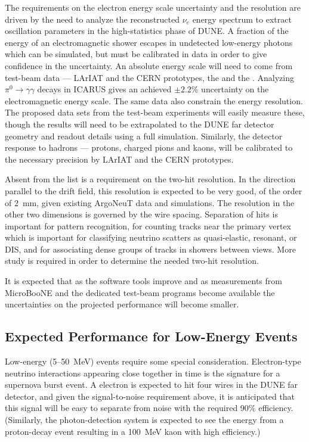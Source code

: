 The requirements on the electron energy scale uncertainty and the
resolution are driven by the need to analyze the reconstructed $\nu_e$
energy spectrum to extract oscillation parameters in the
high-statistics phase of DUNE.  A fraction of the energy of an
electromagnetic shower escapes in undetected low-energy photons which
can be simulated, but must be calibrated in data in order to give
confidence in the uncertainty.  An absolute energy scale will need to
come from test-beam data --- LArIAT and the CERN prototypes, the
\cernsingleproto{} and the \cerndualproto.  Analyzing
$\pi^0\rightarrow\gamma\gamma$ decays in ICARUS\cite{ICARUS-pizero}
gives an achieved $\pm 2.2$\% uncertainty on the electromagnetic
energy scale.  The same data also constrain the energy resolution.
The proposed data sets from the test-beam experiments will easily
measure these, though the results will need to be extrapolated to the
DUNE far detector geometry and readout details using a full
simulation.  Similarly, the detector response to hadrons --- protons,
charged pions and kaons, will be calibrated to the necessary precision
by LArIAT and the CERN prototypes.


Absent from the list is a requirement on the two-hit resolution.  In the
direction parallel to the drift field, this resolution is expected to
be very good, of the order of 2~mm, given existing ArgoNeuT data and
simulations.  The resolution in the other two dimensions is governed
by the wire spacing.  Separation of hits is important for pattern
recognition, for counting tracks near the primary vertex which is
important for classifying neutrino scatters as quasi-elastic,
resonant, or DIS, and for associating dense groups of tracks in
showers between views.  More study is required in order to determine
the needed two-hit resolution.

It is expected that as the software tools improve and as measurements
from MicroBooNE and the dedicated test-beam programs become
available the uncertainties on the projected performance will become
smaller.

\subsection{Expected Performance for Low-Energy Events}\label{sec:detectors-fd-ref-perf-lowe}

Low-energy (5--50~MeV) events require some special consideration.
Electron-type neutrino interactions
appearing close together in time is the signature for a supernova
burst event.  A  electron is expected to hit four wires in the DUNE far
detector, and given the signal-to-noise requirement above, it is
anticipated that this signal will be easy to separate from noise with
the required 90\% efficiency.  (Similarly, the photon-detection system
is expected to see the energy from a proton-decay event resulting in a
100~MeV kaon with high efficiency.)

